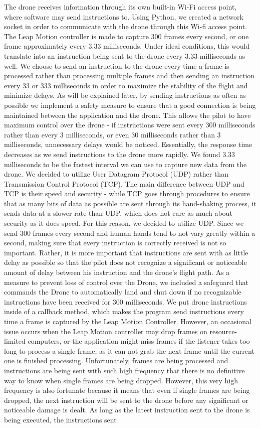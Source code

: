 \documentclass[letterpaper,english, 12pt]{article}
\begin{document}
The drone receives information through its own built-in Wi-Fi access point, where software may send instructions to. Using Python, we created a network socket in order to communicate with the drone through this Wi-fi access point. The Leap Motion controller is made to capture 300 frames every second, or one frame approximately every 3.33 milliseconds. Under ideal conditions, this would translate into an instruction being sent to the drone every 3.33 milliseconds as well. We choose to send an instruction to the drone every time a frame is processed rather than processing multiple frames and then sending an instruction every 33 or 333 milliseconds in order to maximize the stability of the flight and minimize delays. As will be explained later, by sending instructions as often as possible we implement a safety measure to ensure that a good connection is being maintained between the application and the drone. This allows the pilot to have maximum control over the drone - if instructions were sent every 300 milliseconds rather than every 3 milliseconds, or even 30 milliseconds rather than 3 milliseconds, unnecessary delays would be noticed. Essentially, the response time decreases as we send instructions to the drone more rapidly. We found 3.33 milliseconds to be the fastest interval we can use to capture new data from the drone.  We decided to utilize User Datagram Protocol (UDP) rather than Transmission Control Protocol (TCP). The main difference between UDP and TCP is their speed and security - while TCP goes through procedures to ensure that as many bits of data as possible are sent through its hand-shaking process, it sends data at a slower rate than UDP, which does not care as much about security as it does speed. For this reason, we decided to utilize UDP. Since we send 300 frames every second and human hands tend to not vary greatly within a second, making sure that every instruction is correctly received is not so important. Rather, it is more important that instructions are sent with as little delay as possible so that the pilot does not recognize a significant or noticeable amount of delay between his instruction and the drone's flight path. As a measure to prevent loss of control over the Drone, we included a safeguard that commands the Drone to automatically land and shut down if no recognizable instructions have been received for 300 milliseconds. We put drone instructions inside of a callback method, which makes the program send instructions every time a frame is captured by the Leap Motion Controller. However, an occasional issue occurs when the Leap Motion controller may drop frames on resource-limited computers, or the application might miss frames if the listener takes too long to process a single frame, as it can not grab the next frame until the current one is finished processing. Unfortunately, frames are being processed and instructions are being sent with such high frequency that there is no definitive way to know when single frames are being dropped. However, this very high frequency is also fortunate because it means that even if single frames are being dropped, the next instruction will be sent to the drone before any significant or noticeable  damage is dealt. As long as the latest instruction sent to the drone is being executed, the instructions sent 
\end{document}
